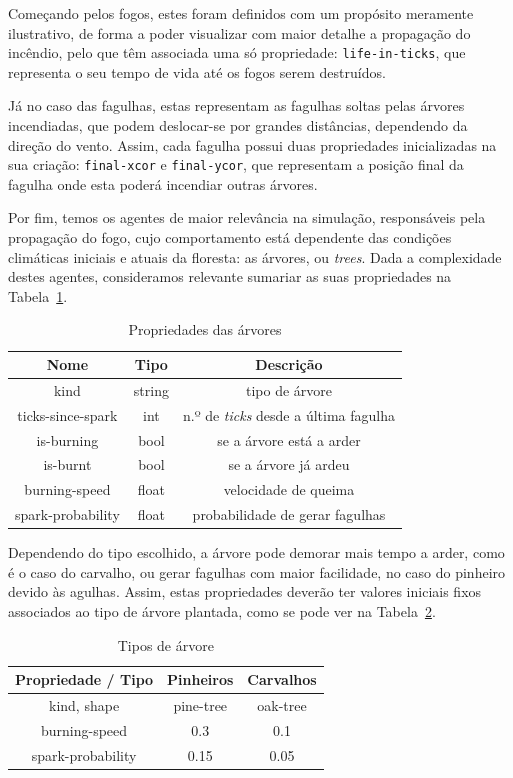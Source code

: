 Começando pelos fogos, estes foram definidos com um propósito meramente ilustrativo, de forma a poder visualizar com maior detalhe a propagação do incêndio, pelo que têm associada uma só propriedade: \texttt{life-in-ticks}, que representa o seu tempo de vida até os fogos serem destruídos.

Já no caso das fagulhas, estas representam as fagulhas soltas pelas árvores incendiadas, que podem deslocar-se por grandes distâncias, dependendo da direção do vento. Assim, cada fagulha possui duas propriedades inicializadas na sua criação: \texttt{final-xcor} e \texttt{final-ycor}, que representam a posição final da fagulha onde esta poderá incendiar outras árvores.

Por fim, temos os agentes de maior relevância na simulação, responsáveis pela propagação do fogo, cujo comportamento está dependente das condições climáticas iniciais e atuais da floresta: as árvores, ou \textit{trees}. Dada a complexidade destes agentes, consideramos relevante sumariar as suas propriedades na Tabela~\ref{tab:tree_props}.

\begin{table}[tbhp]
    \centering
    \begin{tabular}{ccc} \hline
    \textbf{Nome} & \textbf{Tipo} & \textbf{Descrição} \\ \hline
    kind & string & tipo de árvore \\
    ticks-since-spark & int & n.º de \textit{ticks} desde a última fagulha \\
    is-burning & bool & se a árvore está a arder \\
    is-burnt & bool & se a árvore já ardeu \\
    burning-speed & float & velocidade de queima \\
    spark-probability & float & probabilidade de gerar fagulhas \\ \hline
    \end{tabular}
    \caption{Propriedades das árvores}
    \label{tab:tree_props}
\end{table}

Dependendo do tipo escolhido, a árvore pode demorar mais tempo a arder, como é o caso do carvalho, ou gerar fagulhas com maior facilidade, no caso do pinheiro devido às agulhas. Assim, estas propriedades deverão ter valores iniciais fixos associados ao tipo de árvore plantada, como se pode ver na Tabela~\ref{tab:tree_types}.

\begin{table}[tbhp]
    \centering
    \begin{tabular}{ccc} \hline
    \textbf{Propriedade / Tipo} & \textbf{Pinheiros} & \textbf{Carvalhos} \\ \hline
    kind, shape & pine-tree & oak-tree \\
    burning-speed & 0.3 & 0.1 \\
    spark-probability & 0.15 & 0.05 \\ \hline
    \end{tabular}
    \caption{Tipos de árvore}
    \label{tab:tree_types}
\end{table}


